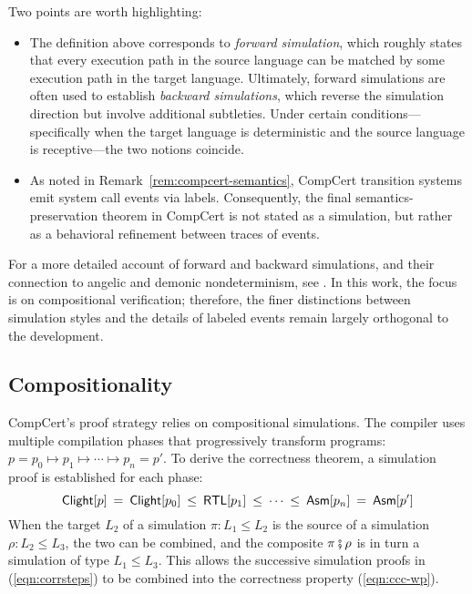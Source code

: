 \begin{remark}
  Two points are worth highlighting:
  \begin{itemize}
    \item
      The definition above corresponds to \emph{forward simulation},
      which roughly states that every execution path in the source language
      can be matched by some execution path in the target language.
      Ultimately, forward simulations are often used to
      establish \emph{backward simulations},
      which reverse the simulation direction
      but involve additional subtleties.
      Under certain conditions---specifically
      when the target language is deterministic
      and the source language is receptive---the two notions coincide.

    \item As noted in Remark~\ref{rem:compcert-semantics},
      CompCert transition systems emit system call events
      via labels.
      Consequently, the final semantics-preservation theorem
      in CompCert is not stated as a simulation,
      but rather as a behavioral refinement
      between traces of events.
  \end{itemize}
  For a more detailed account of forward and backward simulations,
  and their connection to angelic and demonic nondeterminism,
  see \citet{thesis}.
  In this work,
  the focus is on compositional verification;
  therefore, the finer distinctions between simulation styles
  and the details of labeled events
  remain largely orthogonal to the development.
\end{remark}

\subsection{Compositionality}

CompCert's proof strategy relies on compositional simulations.
The compiler uses multiple compilation phases
that progressively transform programs:
$
p = p_0 \longmapsto p_1 \longmapsto \cdots \longmapsto p_n = p'
$.
To derive the correctness theorem,
a simulation proof is established for each phase:
\begin{equation}
   \mathsf{Clight} [p] \:=\:
   \mathsf{Clight} [p_0] \:\le\:  \mathsf{RTL} [p_1] \:\le\: \cdots \:\le\:  \mathsf{Asm} [p_n]
  \:=\:  \mathsf{Asm} [p']
  \label{eqn:corrsteps}
\end{equation}
When the target $L_2$ of a simulation $\pi : L_1 \le L_2$
is the source of a simulation $\rho : L_2 \le L_3$,
the two can be combined, and the composite
$\pi \fatsemi \rho$
is in turn a simulation of type $L_1 \le L_3$.
This allows
the successive simulation proofs in (\ref{eqn:corrsteps})
to be combined into the correctness property (\ref{eqn:ccc-wp}).

